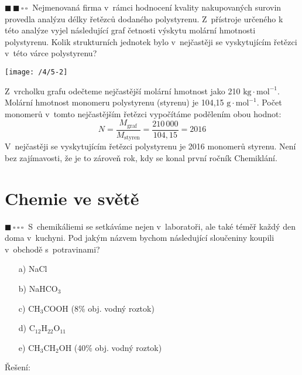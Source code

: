 \documentclass{book}
\newcommand{\jeden}{$\blacksquare \, \square \, \square \, \square \; \; $}
\newcommand{\dva}{$\blacksquare \, \blacksquare \, \square \, \square \; \; $}
\renewenvironment{quotation}{\par}{\par} %
\begin{document}
\hrulefill %
\begin{quotation}
\dva Nejmenovaná firma v~rámci hodnocení kvality nakupovaných surovin provedla
analýzu délky řetězců dodaného polystyrenu. Z~přístroje určeného k
této analýze vyjel následující graf četnosti výskytu molární hmotnosti
polystyrenu. Kolik strukturních jednotek bylo v~nejčastěji se vyskytujícím řetězci v~této várce polystyrenu?
\end{quotation} \dotfill \par 
\noindent \begin{center}

\texttt{[image: /4/5-2]}

\par\end{center}

Z~vrcholku grafu odečteme nejčastější molární hmotnost jako 210 $\mathrm{kg\cdot mol^{-1}}$.
Molární hmotnost monomeru polystyrenu (styrenu) je 104,15 $\mathrm{g\cdot mol^{-1}}$. Počet
monomerů v~tomto nejčastějším řetězci vypočítáme podělením obou hodnot:
\[
N=\frac{M_{\mathrm{graf}}}{M_{\mathrm{styren}}}=\frac{210\,000}{104,15}=2016
\]
 V~nejčastěji se vyskytujícím řetězci polystyrenu je 2016 monomerů
styrenu. Není bez zajímavosti, že je to zároveň rok, kdy se konal
první ročník Chemiklání. 

\section{Chemie ve světě}

\begin{quotation}
\jeden S~chemikáliemi se setkáváme nejen v~laboratoři, ale také téměř každý
den doma v~kuchyni. Pod jakým názvem bychom následující sloučeniny
koupili v~obchodě s~potravinami? 
\begin{itemize}[topsep=0mm,itemsep=0mm]
\item [{a)}] NaCl
\item [{b)}] NaHCO$_{3}$ 
\item [{c)}] CH$_{3}$COOH (8\% obj. vodný roztok)
\item [{d)}] C$_{12}$H$_{22}$O$_{11}$ 
\item [{e)}] CH$_{3}$CH$_{2}$OH (40\% obj. vodný roztok)
\end{itemize}
\end{quotation} \dotfill \par 
\newpage %
Řešení:\\
\end{document}
